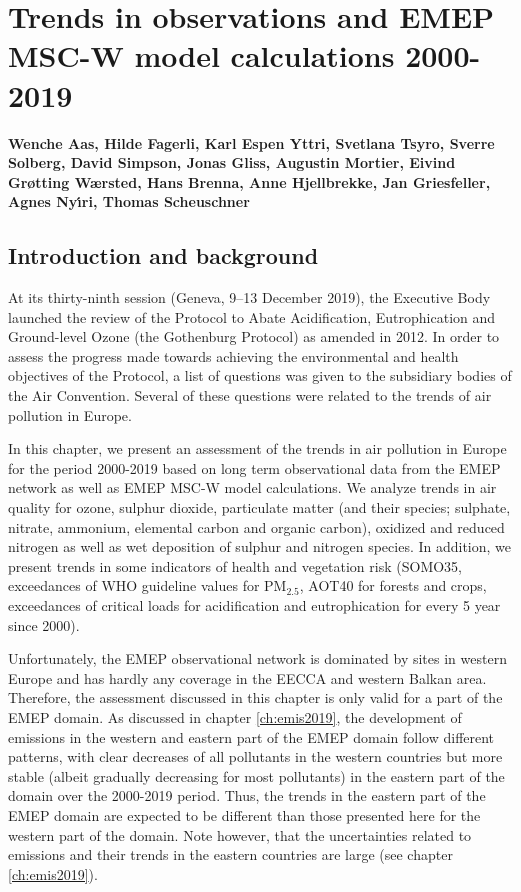 \chapter[Trends]{Trends in observations and EMEP MSC-W model calculations 2000-2019}
\label{ch:Trends}

{\bf{Wenche Aas, Hilde Fagerli, Karl Espen Yttri, Svetlana Tsyro, Sverre Solberg, David Simpson, Jonas Gliss, Augustin Mortier, Eivind Grøtting Wærsted, Hans Brenna, Anne Hjellbrekke, Jan Griesfeller, Agnes Ny\'{\i}ri, Thomas Scheuschner}}\\



\section{\label{sec:Trends_introduction}Introduction and background}
At its thirty-ninth session (Geneva, 9–13 December 2019), the Executive Body launched the review of the Protocol to Abate Acidification, Eutrophication and Ground-level Ozone (the Gothenburg Protocol) as amended in 2012. In order to assess  the progress made towards achieving the environmental and health objectives of the Protocol, a
list of questions was given to the subsidiary bodies of the Air Convention. Several of these questions were related to the trends of air pollution in Europe. 

In this chapter, we present an assessment of the trends in air pollution in Europe for the period 2000-2019 based on long term observational data from the EMEP network as well as EMEP MSC-W model calculations. We analyze trends in air quality for ozone, sulphur dioxide, particulate matter (and their species; sulphate, nitrate, ammonium, elemental carbon and organic carbon), oxidized and reduced nitrogen as well as wet deposition of sulphur and nitrogen species. In addition, we present trends in some indicators of health and vegetation risk (SOMO35, exceedances of WHO guideline values for PM$_{2.5}$, AOT40 for forests and crops, exceedances of critical loads for acidification and eutrophication for every 5 year since 2000).

Unfortunately, the EMEP observational network is dominated by sites in western Europe and has hardly any coverage in the EECCA and western Balkan area. Therefore, the assessment discussed in this chapter is only valid for a part of the EMEP domain. As discussed in chapter \ref{ch:emis2019}, the development of emissions in the western and eastern part of the EMEP domain follow different patterns, with clear decreases of all pollutants in the western countries  but more stable (albeit gradually decreasing for most pollutants) in the eastern part of the domain over the 2000-2019 period. Thus, the trends in the eastern part of the EMEP domain are expected to be different than those presented here for the western part of the domain. Note however, that the uncertainties related to emissions and their trends in the eastern countries are large (see chapter \ref{ch:emis2019}).


